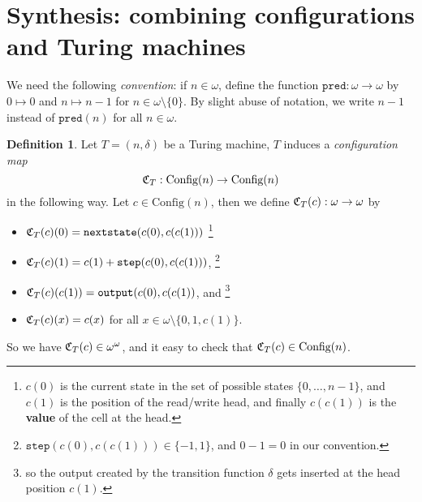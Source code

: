 \documentclass[12pt, a4paper]{amsart}
\theoremstyle{definition}
\newtheorem{definition}[lemma]{Definition}
\newcommand{\C}{\text{Config}}
\begin{document}
\section{Synthesis: combining configurations and Turing machines}

We need the following {\em convention}: if $n\in\omega$, define the function 
$\mathtt{pred}:\omega\to \omega$ by $0 \mapsto 0$ and $n \mapsto n-1$ for $n\in\omega
\setminus\{0\}$. By slight abuse of notation, we write $n-1$ instead of 
$\mathtt{pred}(n)$ for all $n\in \omega$.

\begin{definition}
    Let $T=(n,\delta)$ be a Turing machine, $T$ induces a {\em configuration
    map} $${\frak C}_T: \C(n)\to \C(n)$$ in the following way. Let $c\in \C(n)$,
    then we define ${\frak C}_T(c): \omega \to \omega$ by

    \begin{itemize}
        \item ${\frak C}_T(c)(0) = \mathtt{nextstate}(c(0), c(c(1)))$
            \footnote{$c(0)$ is the current state 
            in the set of possible states $\{0,\ldots,n-1\}$, and $c(1)$
            is the position of the read/write head, and finally $c(c(1))$ is the
            {\bf value} of the cell at the head.}
        \item ${\frak C}_T(c)(1) = c(1) + \mathtt{step}(c(0), c(c(1)))$, 
            \footnote{$\mathtt{step}(c(0),c(c(1)))\in\{-1,1\}$, and $0 - 1 = 0$ in
            our convention.}
        \item ${\frak C}_T(c)(c(1)) = \mathtt{output}(c(0), c(c(1))$, and
            \footnote{so the output created by the transition function $\delta$ gets
            inserted at the head position $c(1)$.}
        \item ${\frak C}_T(c)(x) = c(x)$ for all $x\in\omega \setminus \{0,1,c(1)\}$. 
    \end{itemize}
    So we have ${\frak C}_T(c) \in \omega^\omega$, and it easy to check that
    ${\frak C}_T(c) \in \C(n)$. 
\end{definition}
\end{document}
